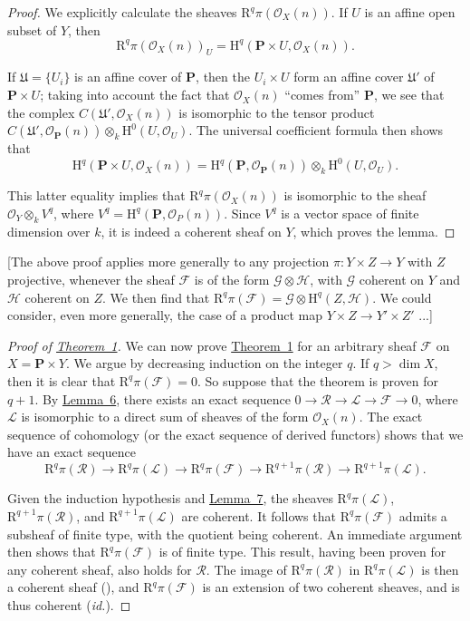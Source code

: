 \documentclass{article}
\newcommand{\scr}[1]{{\mathscr{#1}}}
\newcommand{\HH}{\mathrm{H}}
\newcommand{\RR}{\mathrm{R}}
\newcommand{\PP}{\mathbf{P}}
\newcommand{\oldpage}[1]{\marginpar{\footnotesize$\Big\vert$ \textit{p.~#1}}}
\begin{document}
\begin{proof}
  We explicitly calculate the sheaves $\RR^q\pi(\scr{O}_X(n))$.
  If $U$ is an affine open
  \oldpage{104}
  subset of $Y$, then
  \[
    \RR^q\pi(\scr{O}_X(n))_U = \HH^q(\PP\times U,\scr{O}_X(n)).
  \]

  If $\mathfrak{U}=\{U_i\}$ is an affine cover of $\PP$, then the $U_i\times U$ form an affine cover $\mathfrak{U}'$ of $\PP\times U$;
  taking into account the fact that $\scr{O}_X(n)$ ``comes from'' $\PP$, we see that the complex $C(\mathfrak{U}',\scr{O}_X(n))$ is isomorphic to the tensor product $C(\mathfrak{U}',\scr{O}_{\PP}(n))\otimes_k\HH^0(U,\scr{O}_U)$.
  The universal coefficient formula then shows that
  \[
    \HH^q(\PP\times U,\scr{O}_X(n)) = \HH^q(\PP,\scr{O}_{\PP}(n))\otimes_k\HH^0(U,\scr{O}_U).
  \]

  This latter equality implies that $\RR^q\pi(\scr{O}_X(n))$ is isomorphic to the sheaf $\scr{O}_Y\otimes_k V^q$, where $V^q=\HH^q(\PP,\scr{O}_P(n))$.
  Since $V^q$ is a vector space of finite dimension over $k$, it is indeed a coherent sheaf on $Y$, which proves the lemma.
\end{proof}

  [The above proof applies more generally to any projection $\pi\colon Y\times Z\to Y$ with $Z$ projective, whenever the sheaf $\scr{F}$ is of the form $\scr{G}\otimes\scr{H}$, with $\scr{G}$ coherent on $Y$ and $\scr{H}$ coherent on $Z$.
  We then find that $\RR^q\pi(\scr{F})=\scr{G}\otimes\HH^q(Z,\scr{H})$.
  We could consider, even more generally, the case of a product map $Y\times Z\to Y'\times Z'$ ...]

\begin{proof}[Proof of {\hyperref[theorem1]{Theorem~1}}]
  We can now prove \hyperref[theorem1]{Theorem~1} for an arbitrary sheaf $\scr{F}$ on $X=\PP\times Y$.
  We argue by decreasing induction on the integer $q$.
  If $q>\dim X$, then it is clear that $\RR^q\pi(\scr{F})=0$.
  So suppose that the theorem is proven for $q+1$.
  By \hyperref[lemma6]{Lemma~6}, there exists an exact sequence $0\to\scr{R}\to\scr{L}\to\scr{F}\to0$, where $\scr{L}$ is isomorphic to a direct sum of sheaves of the form $\scr{O}_X(n)$.
  The exact sequence of cohomology (or the exact sequence of derived functors) shows that we have an exact sequence
  \[
    \RR^q\pi(\scr{R}) \to
    \RR^q\pi(\scr{L}) \to
    \RR^q\pi(\scr{F}) \to
    \RR^{q+1}\pi(\scr{R}) \to
    \RR^{q+1}\pi(\scr{L}).
  \]

  Given the induction hypothesis and \hyperref[lemma7]{Lemma~7}, the sheaves $\RR^q\pi(\scr{L})$, $\RR^{q+1}\pi(\scr{R})$, and $\RR^{q+1}\pi(\scr{L})$ are coherent.
  It follows that $\RR^q\pi(\scr{F})$ admits a subsheaf of finite type, with the quotient being coherent.
  An immediate argument then shows that $\RR^q\pi(\scr{F})$ is of finite type.
  This result, having been proven for any coherent sheaf, also holds for $\scr{R}$.
  The image of $\RR^q\pi(\scr{R})$ in $\RR^q\pi(\scr{L})$ is then a coherent sheaf (\cite[p.~208]{12}), and $\RR^q\pi(\scr{F})$ is an extension of two coherent sheaves, and is thus coherent (\emph{id.}).
\end{proof}
\end{document}

